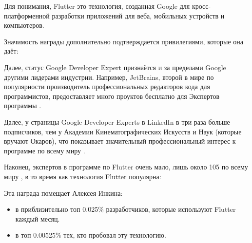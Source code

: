 Для понимания, Flutter это технология, созданная Google для кросс-платформенной разработки приложений для веба, мобильных устройств и компьютеров.

Значимость награды дополнительно подтверждается привилегиями, которые она даёт:


Далее, статус Google Developer Expert признаётся и за пределами Google другими лидерами индустрии.
Например, JetBrains, второй в мире по популярности производитель профессиональных
редакторов кода для программистов, предоставляет много проуктов бесплатно для Экспертов программы
.

Далее, у страницы Google Developer Experts в LinkedIn
в три раза больше подписчиков, чем у Академии Кинематографических Искусств и Наук
(которые вручают Окаров), что показывает значительный профессиональный интерес
к программе по всему миру .

Наконец, экспертов в программе по Flutter очень мало, лишь около 105 по всему миру
, в то время как технология Flutter популярна:


Эта награда помещает Алексея Инкина:

\begin{itemize}
    \item в приблизительно топ 0.025\% разработчиков, которые используют Flutter каждый месяц.
    \item в топ 0.00525\% тех, кто пробовал эту технологию.
\end{itemize}
